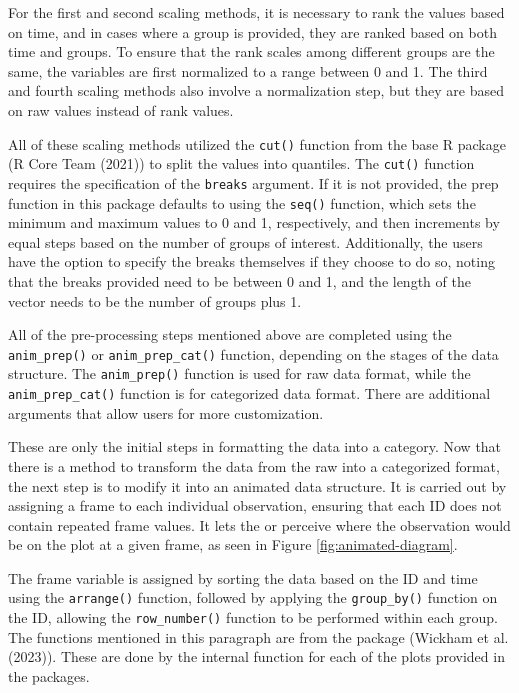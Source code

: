 For the first and second scaling methods, it is necessary to rank the values based on time, and in cases where a group is provided, they are ranked based on both time and groups. To ensure that the rank scales among different groups are the same, the variables are first normalized to a range between 0 and 1. The third and fourth scaling methods also involve a normalization step, but they are based on raw values instead of rank values.

All of these scaling methods utilized the \texttt{cut()} function from the base R package (R Core Team (2021)) to split the values into quantiles. The \texttt{cut()} function requires the specification of the \texttt{breaks} argument. If it is not provided, the prep function in this package defaults to using the \texttt{seq()} function, which sets the minimum and maximum values to 0 and 1, respectively, and then increments by equal steps based on the number of groups of interest. Additionally, the users have the option to specify the breaks themselves if they choose to do so, noting that the breaks provided need to be between 0 and 1, and the length of the vector needs to be the number of groups plus 1.

All of the pre-processing steps mentioned above are completed using the \texttt{anim\_prep()} or \texttt{anim\_prep\_cat()} function, depending on the stages of the data structure. The \texttt{anim\_prep()} function is used for raw data format, while the \texttt{anim\_prep\_cat()} function is for categorized data format. There are additional arguments that allow users for more customization.

These are only the initial steps in formatting the data into a category. Now that there is a method to transform the data from the raw into a categorized format, the next step is to modify it into an animated data structure. It is carried out by assigning a frame to each individual observation, ensuring that each ID does not contain repeated frame values. It lets the  or  perceive where the observation would be on the plot at a given frame, as seen in Figure \ref{fig:animated-diagram}.

The frame variable is assigned by sorting the data based on the ID and time using the \texttt{arrange()} function, followed by applying the \texttt{group\_by()} function on the ID, allowing the \texttt{row\_number()} function to be performed within each group. The functions mentioned in this paragraph are from the  package (Wickham et al. (2023)). These are done by the internal function for each of the plots provided in the packages.

